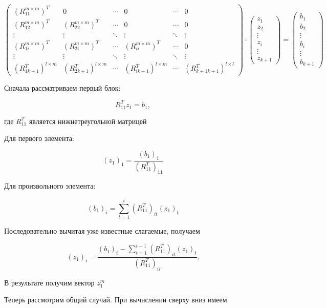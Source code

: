 \documentclass[a4paper,12pt]{article}
\begin{document}
$$
\begin{pmatrix}
  (R_{11}^{m \times m})^T & 0 & \cdots & 0 & \cdots & 0 \\
  (R_{12}^{m \times m})^T & (R_{22}^{m \times m})^T & \cdots & 0 & \cdots & 0 \\
  \vdots & \vdots & \ddots & \vdots & \ddots & \vdots \\
  \hline
  (R_{1i}^{m \times m})^T & (R_{2i}^{m \times m})^T & \cdots & (R_{ii}^{m \times m})^T & \cdots & 0 \\
  \hline
  \vdots & \vdots & \ddots & \vdots & \ddots & \vdots \\
  (R_{1k+1}^T)^{l \times m} & (R_{2k+1}^T)^{l \times m} & \cdots & (R_{ik+1}^T)^{l \times m} & \cdots & (R_{k+1k+1}^T)^{l \times l}
\end{pmatrix}
\cdot
\begin{pmatrix}
  z_1 \\
  z_2 \\
  \vdots \\
  z_i \\
  \vdots \\
  z_{k+1}
\end{pmatrix}
=
\begin{pmatrix}
  b_1 \\
  b_2 \\
  \vdots \\
  b_i \\
  \vdots \\
  b_{k+1}
\end{pmatrix}
$$

Сначала рассматриваем первый блок:

$$
R_{11}^T z_1 = b_1,
$$

где $R_{11}^T$ является нижнетреугольной матрицей

Для первого элемента:

$$
(z_1)_1
=
\frac{(b_1)_1}{(R_{11}^T)_{11}}
$$

Для произвольного элемента:

$$
(b_1)_i
=
\sum_{t=1}^{i}
(R_{11}^T)_{it}(z_1)_t
$$

Последовательно вычитая уже известные слагаемые, получаем

$$
(z_1)_i
=
\frac{
  (b_1)_i
  -
  \sum_{t=1}^{i-1} (R_{11}^T)_{it} (z_1)_t
}{
  (R_{11}^T)_{ii}
}.
$$

В результате получим вектор $z_1^m$

\medskip

Теперь рассмотрим общий случай. При вычислении сверху вниз имеем
\end{document}
